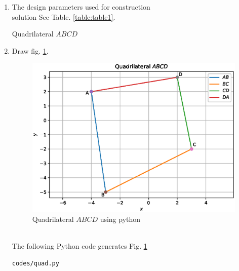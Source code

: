 \renewcommand{\theequation}{\theenumi}
\begin{enumerate}[label=\thesection.\arabic*.,ref=\thesection.\theenumi]

\item The design parameters used for construction \\
solution See Table. \ref{table:table1}.
\begin{table}[ht!]
\centering

\caption{Quadrilateral $ABCD$}
\label{table:table1}	
\end{table} 


\item Draw fig. \ref{fig:quad_1}.
\begin{figure}[!ht]
\centering
\includegraphics[width=\columnwidth]{./codes/quad.eps}
\caption{Quadrilateral $ABCD$ using python}
\label{fig:quad_1}
\end{figure} \\
\solution The  following Python code generates Fig. \ref{fig:quad_1}

\begin{lstlisting}
codes/quad.py
\end{lstlisting}





 
%
\end{enumerate}
  


